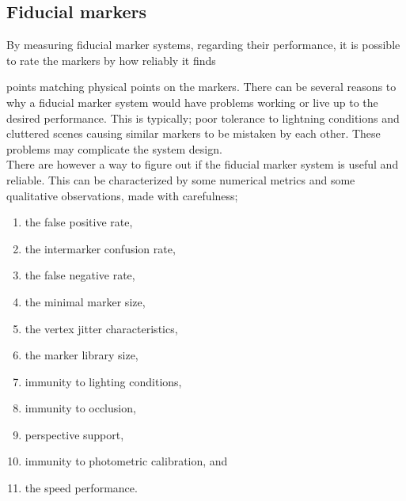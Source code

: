 			\subsection{Fiducial markers}\label{sec:fiducialMarkers}
				By measuring fiducial marker systems, regarding their performance, it is possible to rate the markers by how reliably it finds 
				
				 points matching physical points on the markers. There can be several reasons to why a fiducial marker system would have problems working or live up to the desired performance. This is typically; poor tolerance to lightning conditions and cluttered scenes causing similar markers to be mistaken by each other\cite{fiducialMarkers}. These problems may complicate the system design.\\
				
				There are however a way to figure out if the fiducial marker system is useful and reliable. This can be characterized by some numerical metrics and some qualitative observations, made with carefulness;\\
				\begin{enumerate}
					\item the false positive rate,
					\item the intermarker confusion rate,
					\item the false negative rate,
					\item the minimal marker size,
					\item the vertex jitter characteristics,
					\item the marker library size,
					\item immunity to lighting conditions,
					\item immunity to occlusion,
					\item perspective support,
					\item immunity to photometric calibration, and
					\item the speed performance.\\
				\end{enumerate}
				
